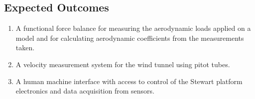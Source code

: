 \subsection{Expected Outcomes}
\begin{enumerate}
\item A functional force balance for measuring the aerodynamic loads applied on a model
and for calculating aerodynamic coefficients from the measurements taken.
\item A velocity measurement system for the wind tunnel using pitot tubes.
\item A human machine interface with access to control of the Stewart platform electronics
and data acquisition from sensors.
\end{enumerate}
